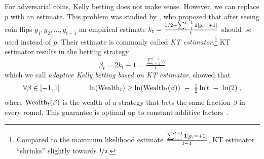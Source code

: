 For adversarial coins, Kelly betting does not make sense. However, we can
replace $p$ with an estimate. This problem was studied by \citet{KrichevskyT81},
who proposed that after seeing coin flips $g_1, g_2, \dots, g_{t-1}$ an
empirical estimate $k_t = \frac{1/2 + \sum_{i=1}^{t-1} \mathbf{1}[g_i = +1]}{t}$
should be used instead of $p$. Their estimate is commonly called \emph{KT
estimator}.\footnote{Compared to the maximum likelihood estimate
$\frac{\sum_{i=1}^{t-1} \mathbf{1}[g_i = +1]}{t-1}$, KT estimator ``shrinks''
slightly towards $\nicefrac{1}{2}$.} KT estimator results in the betting strategy
\begin{equation}
\label{equation:kt-estimator-betting-strategy}
\beta_t = 2k_t - 1 = \tfrac{\sum_{i=1}^{t-1} g_i}{t}
\end{equation}
which we call \emph{adaptive Kelly betting based on KT estimator}.
\citeauthor{KrichevskyT81} showed that
\[
\forall \beta \in [-1,1] \qquad \qquad \ln(\Wealth_t) \ge \ln(\Wealth_t(\beta)) \ - \ \tfrac{1}{2} \ln t \ - \ \ln(2) \; ,
\]
where $\operatorname{Wealth}_t(\beta)$ is the wealth of a strategy that bets the same fraction
$\beta$ in every round. This guarantee is optimal up to constant additive factors~\citep{Cesa-BianchiL06}.
